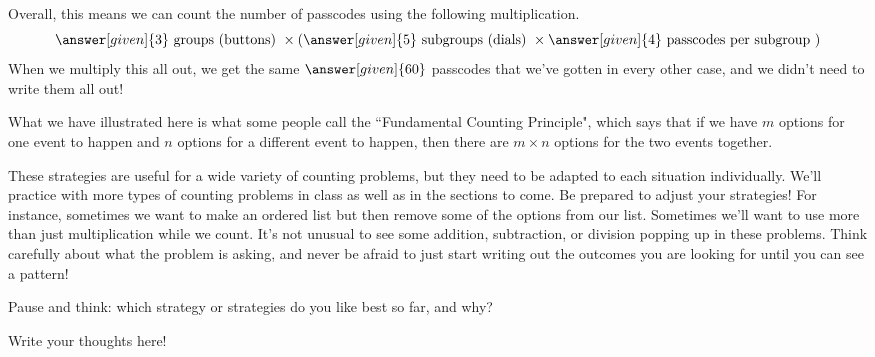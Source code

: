\documentclass{ximera}
\begin{document}
\begin{example}
 Overall, this means we can count the number of passcodes using the following multiplication.
 \[
 \answer[given]{3} \textrm{ groups (buttons) } \times \left ( \answer[given]{5} \textrm{ subgroups (dials) } \times \answer[given]{4} \textrm{ passcodes per subgroup } \right )
 \]
When we multiply this all out, we get the same $\answer[given]{60}$ passcodes that we've gotten in every other case, and we didn't need to write them all out!

\end{example}

What we have illustrated here is what some people call the ``Fundamental Counting Principle", which says that if we have $m$ options for one event to happen and $n$ options for a different event to happen, then there are $m \times n$ options for the two events together.



These strategies are useful for a wide variety of counting problems, but they need to be adapted to each situation individually. We'll practice with more types of counting problems in class as well as in the sections to come. Be prepared to adjust your strategies! For instance, sometimes we want to make an ordered list but then remove some of the options from our list. Sometimes we'll want to use more than just multiplication while we count. It's not unusual to see some addition, subtraction, or division popping up in these problems. Think carefully about what the problem is asking, and never be afraid to just start writing out the outcomes you are looking for until you can see a pattern!


\begin{question}
Pause and think: which strategy or strategies do you like best so far, and why?
\begin{freeResponse}
Write your thoughts here!
\end{freeResponse}
\end{question}
\end{document}
